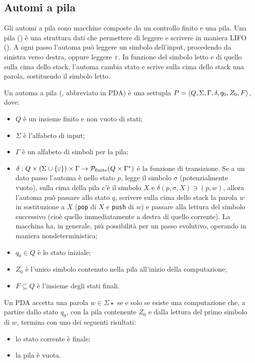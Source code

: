 \subsection{Automi a pila}\label{subs:prel:PDA}
Gli automi a pila sono macchine composte da un controllo finito e una pila. Una pila () è una struttura dati che permettere di leggere e scrivere in maniera LIFO (). A ogni passo l'automa può leggere un simbolo dell'input, procedendo da sinistra verso destra, oppure leggere $\varepsilon$. In funzione del simbolo letto e di quello sulla cima dello stack, l'automa cambia stato e scrive sulla cima dello stack una parola, sostituendo il simbolo letto.
\begin{defin}
	Un automa a pila (, abbreviato in PDA) è una settupla $P=\langle Q,\Sigma,\Gamma,\delta,q_0,Z_0,F \rangle$, dove:
	\begin{itemize}
		\item $Q$ è un insieme finito e non vuoto di stati;
		\item $\Sigma$ è l'alfabeto di input;
		\item $\Gamma$ è un alfabeto di simboli per la pila;
		\item $\delta:Q\times(\Sigma\cup\left\{ \varepsilon \right\})\times\Gamma\to \mathcal P_{\text{finite}}(Q\times\Gamma^*)$ è la funzione di transizione. Se a un dato passo l'automa è nello stato $p$, legge il simbolo $\sigma$ (potenzialmente vuoto), sulla cima della pila c'è il simbolo $X$ e $\delta(p,\sigma,X)\ni (p,w)$, allora l'automa può passare allo stato $q$, scrivere sulla cima dello stack la parola $w$ in sostituzione a $X$ (\verb!pop! di $X$ e \verb!push! di $w$) e passare alla lettura del simbolo successivo (cioè quello immediatamente a destra di quello corrente). La macchina ha, in generale, più possibilità per un passo evolutivo, operando in maniera nondeterministica;
		\item $q_0\in Q$ è lo stato iniziale;
		\item $Z_0$ è l'unico simbolo contenuto nella pila all'inizio della computazione;
		\item $F\subseteq Q$ è l'insieme degli stati finali.
	\end{itemize}
	Un PDA accetta una parola $w\in\Sigma\star$ se e solo se esiste una computazione che, a partire dallo stato $q_0$, con la pila contenente $Z_0$ e dalla lettura del primo simbolo di $w$, termina con uno dei seguenti risultati:
	\begin{itemize}
		\item lo stato corrente è finale;
		\item la pila è vuota.
	\end{itemize}
\end{defin}

